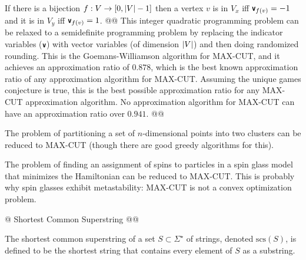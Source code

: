 \documentclass[]{article}
\DeclarePairedDelimiter{\abs}{\lvert}{\rvert}
\DeclarePairedDelimiter{\norm}{\lVert}{\rVert}
\newcommand{\textbs}[1]{{\sffamily\fontseries{sbc}\selectfont #1}}
\newcommand{\mathbs}[1]{\ensuremath{\text{\textbs{#1}}}}
\newcommand{\mbs}[1]{\ensuremath{\mathbs{#1}}}     %
\newcommand{\mbb}[1]{\ensuremath{\mathbb{#1}}}     %
\newcommand{\mrm}[1]{\ensuremath{\mathrm{#1}}}     %
\newcommand{\define}[1]{\textbs{#1}}
\begin{document}
\begin{easylist}[itemize]
{  If there is a bijection $f : V \to [0, \abs{V} - 1]$ then a vertex $v$ is in
  $V_x$ iff $\mbs{v}_{f(v)} = -1$ and it is in $V_y$ iff $\mbs{v}_{f(v)} = 1$.
}
@@ {%
  This integer quadratic programming problem can be relaxed to a semidefinite
  programming problem by replacing the indicator variables ($\mbs{v}$) with
  vector variables (of dimension $\abs{V}$) and then doing randomized rounding.
  This is the Goemans-Williamson algorithm for \textsf{MAX-CUT}, and it achieves
  an approximation ratio of $0.878$, which is the best known approximation ratio
  of any approximation algorithm for \textsf{MAX-CUT}. Assuming the unique games
  conjecture is true, this is the best possible approximation ratio for any
  \textsf{MAX-CUT} approximation algorithm. No approximation algorithm for
  \textsf{MAX-CUT} can have an approximation ratio over $0.941$.
}
@@ {%
  The problem of partitioning a set of $n$-dimensional points into two clusters
  can be reduced to \textsf{MAX-CUT} (though there are good greedy algorithms
  for this).

  The problem of finding an assignment of spins to particles in a spin glass
  model that minimizes the Hamiltonian can be reduced to \textsf{MAX-CUT}.
  This is probably why spin glasses exhibit metastability: \textsf{MAX-CUT} is
  not a convex optimization problem.
}
@ Shortest Common Superstring
@@ {%
  The \define{shortest common superstring} of a set $S \subset \Sigma^{\star}$
  of strings, denoted $\mrm{scs}(S)$, is defined to be the shortest string
  that contains every element of $S$ as a substring.

}
\end{easylist}
\end{document}
